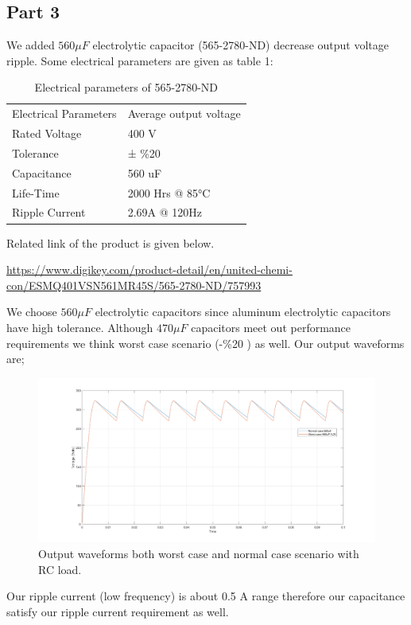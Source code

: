 \documentclass[fleqn, a4paper]{report}
\begin{document}
\subsection*{Part 3}
We added $560 \mu F $ electrolytic capacitor (565-2780-ND) decrease output voltage ripple. Some electrical parameters are given as table 1:
\begin{table}[H]
\centering
\begin{tabular}{ll}
Electrical Parameters & Average output voltage \\
Rated Voltage         & 400 V                  \\
Tolerance             & ± \%20                 \\
Capacitance           & 560 uF                 \\
Life-Time             & 2000 Hrs @ 85°C        \\
Ripple Current        & 2.69A @ 120Hz         
\end{tabular}
\caption{Electrical parameters of 565-2780-ND}

\end{table}
Related link of the product is given below.

\url{https://www.digikey.com/product-detail/en/united-chemi-con/ESMQ401VSN561MR45S/565-2780-ND/757993}

We choose $560 \mu F $ electrolytic capacitors since aluminum electrolytic capacitors have high tolerance. Although $470 \mu F $ capacitors meet out performance requirements we think worst case scenario (-\%20 ) as well. Our output waveforms are;
\begin{figure}[H]
  \includegraphics[width=\linewidth]{RC_load.png}
  \caption{Output waveforms both worst case and normal case scenario with RC load.}
  \label{fig:simulink2}
\end{figure}
Our ripple current (low frequency) is about 0.5 A range therefore our capacitance satisfy our ripple current requirement as well. 
\end{document}
